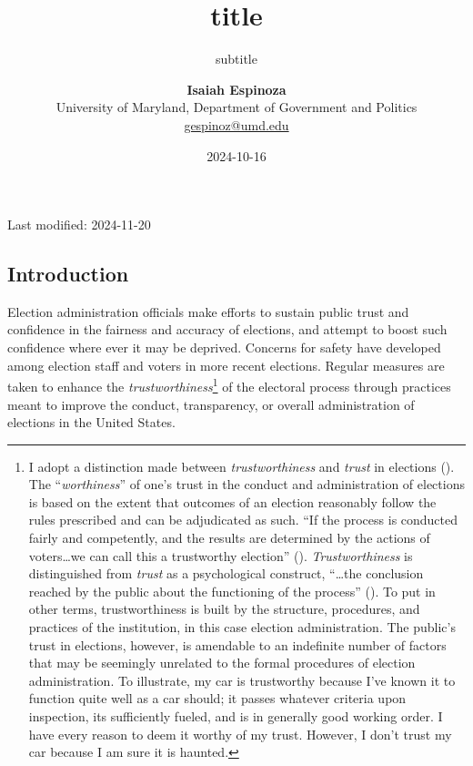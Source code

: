 \documentclass[
  11pt,
  a4paper,
]{scrartcl}
\title{title}
\subtitle{subtitle}
\author{
{\bfseries \normalsize Isaiah Espinoza}%
 \\%
 \small University of Maryland, Department of Government and
Politics \\%
{\footnotesize \url{gespinoz@umd.edu}} \\\vspace{10pt}
}
\date{2024-10-16}
\begin{document}
\renewcommand{\abstractname}{Abstract.}


\maketitle
\newcommand{\datemodified}[1]{Last modified: #1}
{\centering
\hbox{}
{\datemodified{2024-11-20} \par}}


\pagebreak

\subsection{Introduction}\label{introduction}

Election administration officials make efforts to sustain public trust
and confidence in the fairness and accuracy of elections, and attempt to
boost such confidence where ever it may be deprived. Concerns for safety
have developed among election staff and voters in more recent elections.
Regular measures are taken to enhance the
\emph{trustworthiness}\footnote{I adopt a distinction made between
  \emph{trustworthiness} and \emph{trust} in elections
  (). The ``\emph{worthiness}''
  of one's trust in the conduct and administration of elections is based
  on the extent that outcomes of an election reasonably follow the rules
  prescribed and can be adjudicated as such. ``If the process is
  conducted fairly and competently, and the results are determined by
  the actions of voters\ldots we can call this a trustworthy election''
  ().
  \emph{Trustworthiness} is distinguished from \emph{trust} as a
  psychological construct, ``\ldots the conclusion reached by the public
  about the functioning of the process''
  (). To put in other
  terms, trustworthiness is built by the structure, procedures, and
  practices of the institution, in this case election administration.
  The public's trust in elections, however, is amendable to an
  indefinite number of factors that may be seemingly unrelated to the
  formal procedures of election administration. To illustrate, my car is
  trustworthy because I've known it to function quite well as a car
  should; it passes whatever criteria upon inspection, its sufficiently
  fueled, and is in generally good working order. I have every reason to
  deem it worthy of my trust. However, I don't trust my car because I am
  sure it is haunted.} of the electoral process through practices meant
to improve the conduct, transparency, or overall administration of
elections in the United States.
\end{document}
